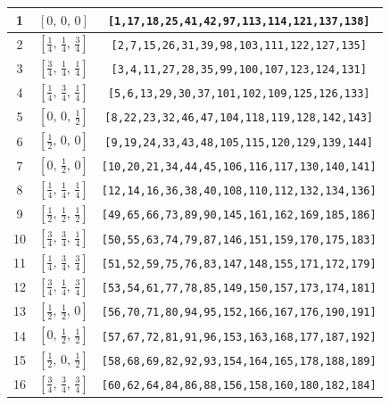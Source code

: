\documentclass[fleqn,8pt]{jsarticle}
\begin{document}
\begin{longtable}{ccc}
1 & $\left[ 0,\, 0,\, 0 \right]$ & {\tt [1,17,18,25,41,42,97,113,114,121,137,138]} \\ \hline
2 & $\left[ \frac{1}{4},\, \frac{1}{4},\, \frac{3}{4} \right]$ & {\tt [2,7,15,26,31,39,98,103,111,122,127,135]} \\ \hline
3 & $\left[ \frac{3}{4},\, \frac{1}{4},\, \frac{1}{4} \right]$ & {\tt [3,4,11,27,28,35,99,100,107,123,124,131]} \\ \hline
4 & $\left[ \frac{1}{4},\, \frac{3}{4},\, \frac{1}{4} \right]$ & {\tt [5,6,13,29,30,37,101,102,109,125,126,133]} \\ \hline
5 & $\left[ 0,\, 0,\, \frac{1}{2} \right]$ & {\tt [8,22,23,32,46,47,104,118,119,128,142,143]} \\ \hline
6 & $\left[ \frac{1}{2},\, 0,\, 0 \right]$ & {\tt [9,19,24,33,43,48,105,115,120,129,139,144]} \\ \hline
7 & $\left[ 0,\, \frac{1}{2},\, 0 \right]$ & {\tt [10,20,21,34,44,45,106,116,117,130,140,141]} \\ \hline
8 & $\left[ \frac{1}{4},\, \frac{1}{4},\, \frac{1}{4} \right]$ & {\tt [12,14,16,36,38,40,108,110,112,132,134,136]} \\ \hline
9 & $\left[ \frac{1}{2},\, \frac{1}{2},\, \frac{1}{2} \right]$ & {\tt [49,65,66,73,89,90,145,161,162,169,185,186]} \\ \hline
10 & $\left[ \frac{3}{4},\, \frac{3}{4},\, \frac{1}{4} \right]$ & {\tt [50,55,63,74,79,87,146,151,159,170,175,183]} \\ \hline
11 & $\left[ \frac{1}{4},\, \frac{3}{4},\, \frac{3}{4} \right]$ & {\tt [51,52,59,75,76,83,147,148,155,171,172,179]} \\ \hline
12 & $\left[ \frac{3}{4},\, \frac{1}{4},\, \frac{3}{4} \right]$ & {\tt [53,54,61,77,78,85,149,150,157,173,174,181]} \\ \hline
13 & $\left[ \frac{1}{2},\, \frac{1}{2},\, 0 \right]$ & {\tt [56,70,71,80,94,95,152,166,167,176,190,191]} \\ \hline
14 & $\left[ 0,\, \frac{1}{2},\, \frac{1}{2} \right]$ & {\tt [57,67,72,81,91,96,153,163,168,177,187,192]} \\ \hline
15 & $\left[ \frac{1}{2},\, 0,\, \frac{1}{2} \right]$ & {\tt [58,68,69,82,92,93,154,164,165,178,188,189]} \\ \hline
16 & $\left[ \frac{3}{4},\, \frac{3}{4},\, \frac{3}{4} \right]$ & {\tt [60,62,64,84,86,88,156,158,160,180,182,184]} \\
\end{longtable}
\renewcommand{\arraystretch}{1.2}
\end{document}
